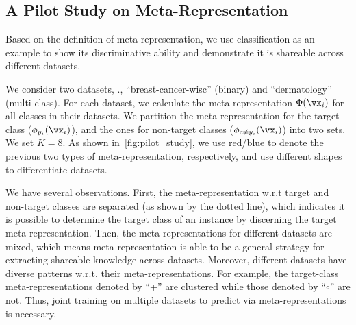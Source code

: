 \subsection{A Pilot Study on Meta-Representation}
Based on the definition of meta-representation, we use classification as an example to show its discriminative ability and demonstrate it is shareable across different datasets.

We consider two datasets, \ie., ``breast-cancer-wisc'' (binary) and ``dermatology'' (multi-class). For each dataset, we calculate the meta-representation $\Phi(\vx_i)$ for all classes in their datasets. We partition the meta-representation for the target class ($\phi_{y_i}(\vx_i)$), and the ones for non-target classes ($\phi_{c\neq y_i}(\vx_i)$) into two sets. We set $K=8$. As shown in~\autoref{fig:pilot_study}, we use red/blue to denote the previous two types of meta-representation, respectively, and use different shapes to differentiate datasets.

We have several observations. First, the meta-representation w.r.t target and non-target classes are separated (as shown by the dotted line), which indicates it is possible to determine the target class of an instance by discerning the target meta-representation. Then, the meta-representations for different datasets are mixed, which means meta-representation is able to be a general strategy for extracting shareable knowledge across datasets. Moreover, different datasets have diverse patterns w.r.t. their meta-representations. For example, the target-class meta-representations denoted by ``+'' are clustered while those denoted by ``$\circ$'' are not. 
Thus, joint training on multiple datasets to predict via meta-representations is necessary.

